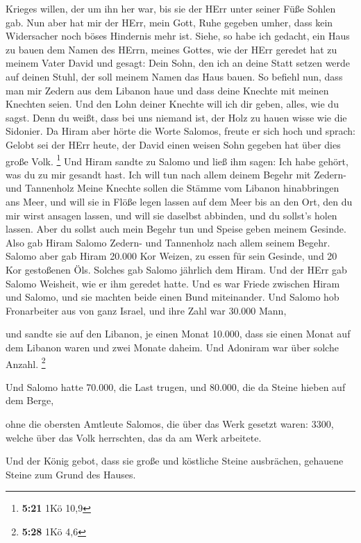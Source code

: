 Krieges willen, der um ihn her war, bis sie der HErr unter seiner Füße
Sohlen gab.  Nun aber hat mir der HErr, mein Gott, Ruhe
gegeben umher, dass kein Widersacher noch böses Hindernis mehr ist.
 Siehe, so habe ich gedacht, ein Haus zu bauen dem Namen
des HErrn, meines Gottes, wie der HErr geredet hat zu meinem Vater David
und gesagt: Dein Sohn, den ich an deine Statt setzen werde auf deinen
Stuhl, der soll meinem Namen das Haus bauen.  So befiehl
nun, dass man mir Zedern aus dem Libanon haue und dass deine Knechte mit
meinen Knechten seien. Und den Lohn deiner Knechte will ich dir geben,
alles, wie du sagst. Denn du weißt, dass bei uns niemand ist, der Holz
zu hauen wisse wie die Sidonier.  Da Hiram aber hörte die
Worte Salomos, freute er sich hoch und sprach: Gelobt sei der HErr
heute, der David einen weisen Sohn gegeben hat über dies große Volk.
\footnote{\textbf{5:21} 1Kö 10,9}  Und Hiram sandte zu
Salomo und ließ ihm sagen: Ich habe gehört, was du zu mir gesandt hast.
Ich will tun nach allem deinem Begehr mit Zedern- und Tannenholz
 Meine Knechte sollen die Stämme vom Libanon hinabbringen
ans Meer, und will sie in Flöße legen lassen auf dem Meer bis an den
Ort, den du mir wirst ansagen lassen, und will sie daselbst abbinden,
und du sollst's holen lassen. Aber du sollst auch mein Begehr tun und
Speise geben meinem Gesinde.  Also gab Hiram Salomo Zedern-
und Tannenholz nach allem seinem Begehr.  Salomo aber gab
Hiram 20.000 Kor Weizen, zu essen für sein Gesinde, und 20 Kor
gestoßenen Öls. Solches gab Salomo jährlich dem Hiram.  Und
der HErr gab Salomo Weisheit, wie er ihm geredet hatte. Und es war
Friede zwischen Hiram und Salomo, und sie machten beide einen Bund
miteinander.  Und Salomo hob Fronarbeiter aus von ganz
Israel, und ihre Zahl war 30.000 Mann,

 und sandte sie auf den Libanon, je einen Monat 10.000,
dass sie einen Monat auf dem Libanon waren und zwei Monate daheim. Und
Adoniram war über solche Anzahl. \footnote{\textbf{5:28} 1Kö 4,6}

 Und Salomo hatte 70.000, die Last trugen, und 80.000, die
da Steine hieben auf dem Berge,

 ohne die obersten Amtleute Salomos, die über das Werk
gesetzt waren: 3300, welche über das Volk herrschten, das da am Werk
arbeitete.

 Und der König gebot, dass sie große und köstliche Steine
ausbrächen, gehauene Steine zum Grund des Hauses.

